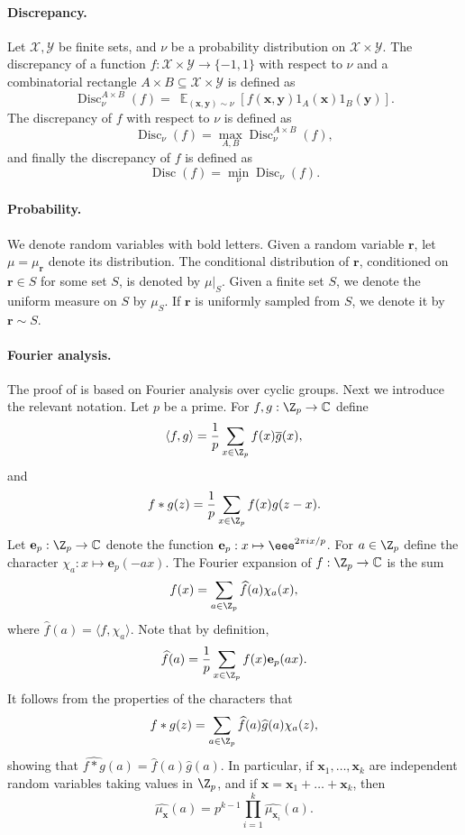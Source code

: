 \documentclass{toc}
\DeclareMathOperator{\Ex}{{\mathbb E}}
\DeclareMathOperator{\Disc}{Disc}
\newcommand{\e}{\mathbf{e}}
\newcommand{\x}{\mathbf{x}}
\newcommand{\y}{\mathbf{y}}
\newcommand{\Br}{\mathbf{r}}   %
\newcommand{\cX}{\mathcal{X}}
\newcommand{\cY}{\mathcal{Y}}
\newcommand{\ip}[1]{\langle #1 \rangle}
\begin{document}
\paragraph{Discrepancy.}
Let $\cX, \cY$ be finite sets, and  $\nu$ be a probability distribution on $\cX \times  \cY$.
The discrepancy of a function $f: \cX \times  \cY \to \{-1,1\}$ with respect to $\nu$ and a combinatorial rectangle $A \times B \subseteq \cX \times \cY$  is  defined as
$$\Disc^{A \times B}_\nu(f) = \ \Ex_{(\x,\y) \sim \nu}  \left[ f(\x,\y) 1_{A}(\x)1_B(\y) \right].$$
The discrepancy  of $f$ with respect to $\nu$ is defined as
$$\Disc_\nu(f)  = \max_{A ,B} \Disc^{A \times B}_\nu(f),$$
and finally the discrepancy of $f$ is defined as
$$\Disc(f) = \min_\nu \Disc_\nu(f).$$



\paragraph{Probability.}
We denote random variables with bold letters. Given a random variable $\Br$, let $\mu=\mu_{\Br}$ denote its distribution. The conditional distribution of $\Br$, conditioned on $\Br \in S$ for some set $S$, is denoted by $\mu|_{S}$. Given a finite set $S$, we denote the uniform measure on $S$ by $\mu_S$.
If $\Br$ is uniformly sampled from $S$, we denote it by $\Br \sim S$.


\paragraph{Fourier analysis.}
The proof of  is based on Fourier analysis over cyclic groups.
%
Next we introduce the relevant  notation.  %
Let $p$ be a prime. For $f,g: \Z_p \to \mathbb{C}$ define
$$\ip{f,g} = \frac{1}{p} \sum_{x \in \Z_p} f(x) \overline{g}(x),$$
and
$$f*g(z) = \frac{1}{p} \sum_{x\in \Z_p} f(x)g(z-x). $$
Let $\e_p: \Z_p \to \mathbb{C}$ denote the function 
$\e_p:x \mapsto \eee^{2\pi i x /p}$. For $a \in \Z_p$ define the character $\chi_a:x \mapsto \e_p(-ax)$. The Fourier expansion of $f:\Z_p \to \mathbb{C}$ is the sum
$$f(x) = \sum_{{a\in \Z_p}} \widehat{f}(a) \chi_a(x),$$
where $\widehat{f}(a)= \ip{f, \chi_a}$. Note that by definition, $$\widehat{f}(a)=\frac{1}{p} \sum_{x \in \Z_p} f(x) \e_p(ax).$$
It follows from the properties of the characters that
$$f*g(z) = \sum_{{a\in \Z_p}} \widehat{f}(a)\widehat{g}(a) \chi_a(z),$$
showing that $\widehat{f*g}(a)= \widehat{f}(a)\widehat{g}(a)$. In particular, if $\x_1,\ldots,\x_k$ are independent random variables
taking values in $\Z_p$, and if $\x=\x_1+\ldots+\x_k$, then
$$
\widehat{\mu_{\x}}(a) = p^{k-1} \prod_{i=1}^k \widehat{\mu_{\x_i}}(a).
$$
\end{document}
